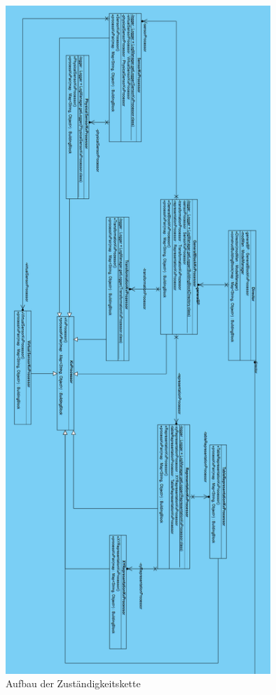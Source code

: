 \documentclass[parskip=full]{scrartcl}
\begin{document}
\begin{figure}[htbp]
	\begin{center}
		\includegraphics[width = 10cm]{Grafiken/director.PNG}
		\caption{Aufbau der Zuständigkeitskette}
		\label{director}
	\end{center}
\end{figure}
\end{document}
